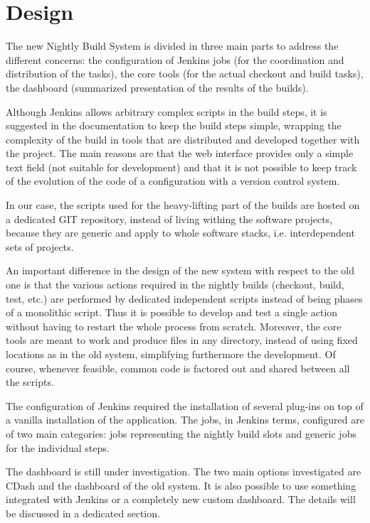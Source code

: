 \section{Design}
\label{sec:Design}
The new Nightly Build System is divided in three main parts to address the different concerns: the
configuration of Jenkins jobs (for the coordination and distribution of the
tasks), the core tools (for the actual checkout and build tasks), the dashboard
(summarized presentation of the results of the builds).

Although Jenkins allows arbitrary complex scripts in the build steps, it is
suggested in the documentation to keep the build steps simple, wrapping the
complexity of the build in tools that are distributed and developed together
with the project.  The main reasons are that the web interface provides only a
simple text field (not suitable for development) and that it is not possible to
keep track of the evolution of the code of a configuration with a version
control system.

In our case, the scripts used for the heavy-lifting part of the builds are
hosted on a dedicated GIT\cite{GIT} repository, instead of living withing the
software projects, because they are generic and apply to whole software stacks,
i.e. interdependent sets of projects.

An important difference in the design of the new system with respect to the old
one is that the various actions required in the nightly builds (checkout, build,
test, etc.) are performed by dedicated independent scripts instead of being
phases of a monolithic script.  Thus it is possible to develop and test a
single action without having to restart the whole process from scratch.
Moreover, the core tools are meant to work and produce files in any directory,
instead of using fixed locations as in the old system, simplifying furthermore
the development. Of course, whenever feasible, common code is factored out and
shared between all the scripts.

The configuration of Jenkins required the installation of several plug-ins on
top of a vanilla installation of the application.  The jobs, in Jenkins terms,
configured are of two main categories: jobs representing the nightly build slots
and generic jobs for the individual steps.

The dashboard is still under investigation.  The two main options investigated
are CDash\cite{CDash} and the dashboard of the old system.  It is also possible
to use something integrated with Jenkins or a completely new custom dashboard.
The details will be discussed in a dedicated section.

